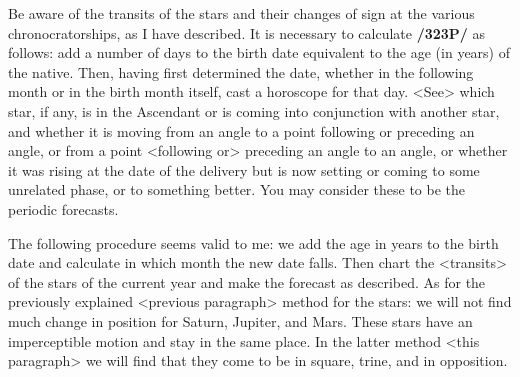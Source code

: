 Be aware of the transits of the stars and their changes of sign at the various chronocratorships, as I have described. It is necessary to calculate \textbf{/323P/} as follows: add a number of days to the birth date equivalent to the age (in years) of the native. Then, having first determined the date, whether in the following month or in the birth month itself, cast a horoscope for that day. <See> which star, if any, is in the Ascendant or is coming into conjunction with another star, and whether it is moving from an angle to a point following
or preceding an angle, or from a point <following or> preceding an angle to an angle, or whether it was rising at the date of the delivery but is now setting or coming to some unrelated phase, or to something better. You may consider these to be the periodic forecasts.

The following procedure seems valid to me: we add the age in years to the birth date and calculate in which month the new date falls. Then chart the <transits> of the stars of the current year and make the forecast as described. As for the previously explained <previous paragraph> method for the stars: we will not find much change in position for Saturn, Jupiter, and Mars. These stars have an imperceptible motion and stay in the same place. In the latter method <this paragraph> we will find that they come to be in square, trine, and in opposition.

\newpage